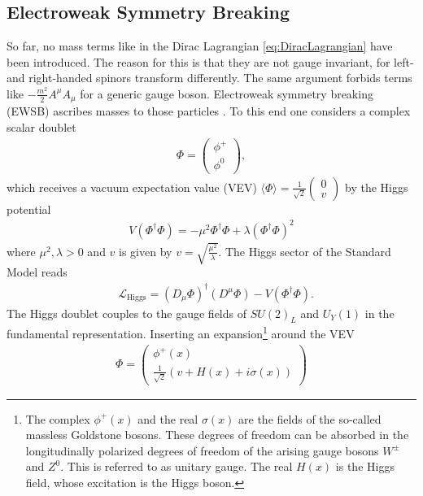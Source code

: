 \subsection{Electroweak Symmetry Breaking}\label{sec:EWSB}
So far, no mass terms like in the Dirac Lagrangian \ref{eq:DiracLagrangian} have been introduced. The reason for this is that they are not gauge invariant, for left- and right-handed spinors transform differently. The same argument forbids terms like $-\frac{m^2}{2}A^\mu A_\mu$ for a generic gauge boson. Electroweak symmetry breaking (EWSB) ascribes masses to those particles \cite{Higgs:1964ia, Higgs:1964pj, Higgs:1966ev, Englert:1964et, Guralnik:1964eu, Kibble:1967sv, Bernstein:1974rd}. To this end one considers a complex scalar doublet
\begin{align}
\Phi = \begin{pmatrix}
\phi^+ \\ 
\phi^0
\end{pmatrix},
\end{align}
which receives a vacuum expectation value (VEV) $\langle \Phi \rangle = \frac{1}{\sqrt{2}}\begin{pmatrix}
0 \\ v
\end{pmatrix}$ by the Higgs potential
\begin{align}
V(\Phi^\dagger\Phi) = -\mu^2 \Phi^\dagger\Phi + \lambda (\Phi^\dagger\Phi)^2
\end{align}
where $\mu^2,\lambda > 0$ and $v$ is given by $v = \sqrt{\frac{\mu^2}{\lambda}}$.
The Higgs sector of the Standard Model reads
\begin{align}
&\mathcal{L}_{\mathrm{Higgs}} = (D_\mu \Phi)^\dagger (D^\mu \Phi) - V(\Phi^\dagger\Phi).
\end{align}
The Higgs doublet couples to the gauge fields of $SU(2)_L$ and $U_Y(1)$ in the fundamental representation. Inserting an expansion\footnote{The complex $\phi^+(x)$ and the real $\sigma(x)$ are the fields of the so-called massless Goldstone bosons. These degrees of freedom can be absorbed in the longitudinally polarized degrees of freedom of the arising gauge bosons $W^\pm$ and $Z^0$. This is referred to as unitary gauge\cite{book:811554}. The real $H(x)$ is the Higgs field, whose excitation is the Higgs boson.} around the VEV 
\begin{align}
\Phi = \begin{pmatrix}
\phi^+(x) \\
\frac{1}{\sqrt{2}} (v + H(x) + i\sigma(x))
\end{pmatrix}
\end{align}
